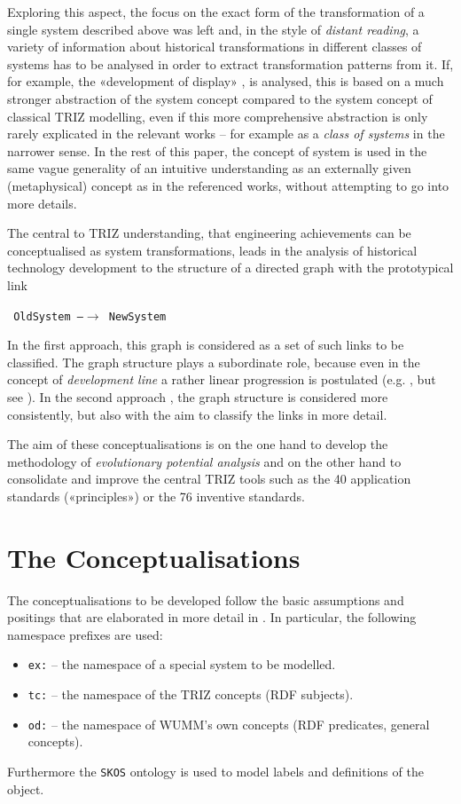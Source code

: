 \documentclass[11pt,a4paper]{article}
\begin{document}
Exploring this aspect, the focus on the exact form of the transformation of a
single system described above was left and, in the style of \emph{distant
  reading}, a variety of information about historical transformations in
different classes of systems has to be analysed in order to extract
transformation patterns from it.  If, for example, the «development of
display» \cite[p. 22]{TESE2018}, \cite[ch. 5]{Shpakovsky2016} is analysed,
this is based on a much stronger abstraction of the system concept compared to
the system concept of classical TRIZ modelling, even if this more
comprehensive abstraction is only rarely explicated in the relevant works --
for example as a \emph{class of systems} in the narrower sense. In the rest of
this paper, the concept of system is used in the same vague generality of an
intuitive understanding as an externally given (metaphysical) concept as in
the referenced works, without attempting to go into more details.

The central to TRIZ understanding, that engineering achievements can be
conceptualised as system transformations, leads in the analysis of historical
technology development to the structure of a directed graph with the
prototypical link
\begin{center}\tt
  OldSystem \textrm{---}$\to$ NewSystem
\end{center}
In the first approach, this graph is considered as a set of such links to be
classified. The graph structure plays a subordinate role, because even in the
concept of \emph{development line} a rather linear progression is postulated
(e.g. \cite[Figure 4.104]{KS}, but see \cite[4.8.4 and Figure 4.72]{KS}). In
the second approach \cite{Shpakovsky2016}, the graph structure is considered
more consistently, but also with the aim to classify the links in more detail.

The aim of these conceptualisations is on the one hand to develop the
methodology of \emph{evolutionary potential analysis} \cite[4.8.7]{KS} and on
the other hand to consolidate and improve the central TRIZ tools such as the
40 application standards («principles») or the 76 inventive standards.

\section{The Conceptualisations}

The conceptualisations to be developed follow the basic assumptions and
positings that are elaborated in more detail in \cite{Graebe2021}. In
particular, the following namespace prefixes are used:
\begin{itemize}[noitemsep]
\item \texttt{ex:} -- the namespace of a special system to be modelled. 
\item \texttt{tc:} -- the namespace of the TRIZ concepts (RDF subjects).
\item \texttt{od:} -- the namespace of WUMM's own concepts (RDF predicates,
  general concepts). 
\end{itemize}
Furthermore the \texttt{SKOS} ontology is used to model labels and definitions
of the object.
\end{document}
